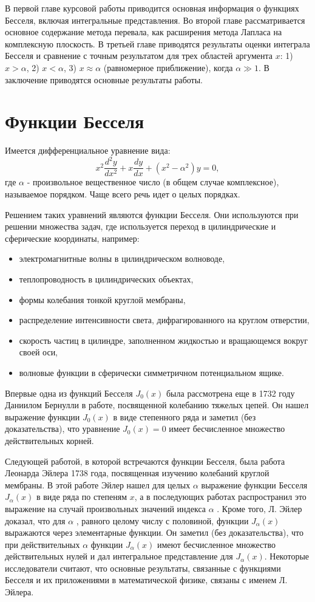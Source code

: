 \documentclass[14pt]{extarticle}
\begin{document}
В первой главе курсовой работы приводится основная информация о функциях Бесселя, включая интегральные представления. Во второй главе рассматривается основное содержание метода перевала, как расширения метода Лапласа на комплексную плоскость. В третьей главе приводятся результаты оценки интеграла Бесселя и сравнение с точным результатом для трех областей аргумента $x$: 1) $x>\alpha$, 2) $x<\alpha$, 3) $x\approx\alpha$ (равномерное приближение), когда $\alpha\gg1$. В заключение приводятся основные результаты работы. 


\section{Функции Бесселя}
Имеется дифференциальное уравнение вида:
\begin{equation}\label{eq:eq4}
x^2\frac{d^2 y}{dx^2}+x\frac{dy}{dx}+(x^2-\alpha^2)y = 0,
\end{equation}
где $\alpha$ - произвольное вещественное число (в общем случае комплексное), называемое порядком. Чаще всего речь идет о целых порядках.

Решением таких уравнений являются функции Бесселя.
Они используются при решении множества задач, где используется переход в цилиндрические и сферические координаты, например:
\begin{itemize}
	\item электромагнитные волны в цилиндрическом волноводе,
	\item теплопроводность в цилиндрических объектах,
	\item формы колебания тонкой круглой мембраны,
	\item распределение интенсивности света, дифрагированного на круглом отверстии,
	\item скорость частиц в цилиндре, заполненном жидкостью и вращающемся вокруг своей оси,
	\item волновые функции в сферически симметричном потенциальном ящике.
\end{itemize}

Впервые одна из функций Бесселя $J_0(x)$ была рассмотрена еще в 1732 году Даниилом Бернулли в работе, посвященной колебанию тяжелых цепей. Он нашел выражение функции $J_0(x)$ в виде степенного ряда и заметил (без доказательства), что уравнение $J_0(x)=0$ имеет бесчисленное множество действительных корней. 

Следующей работой, в которой встречаются функции Бесселя, была работа Леонарда Эйлера 1738 года, посвященная изучению колебаний круглой мембраны. В этой работе Эйлер нашел для целых $\alpha$ выражение функции Бесселя $J_\alpha(x)$ в виде ряда по степеням $x$, а в последующих работах распространил это выражение на случай произвольных значений индекса $\alpha$ . Кроме того, Л. Эйлер доказал, что для $\alpha$ , равного целому числу с половиной, функции $J_\alpha(x)$ выражаются через элементарные функции. Он заметил (без доказательства), что при действительных $\alpha$ функции $J_\alpha(x)$ имеют бесчисленное множество действительных нулей и дал интегральное представление для $J_\alpha(x)$. Некоторые исследователи считают, что основные результаты, связанные с функциями Бесселя и их приложениями в математической физике, связаны с именем Л. Эйлера. \cite{Urmat}  
\end{document}
